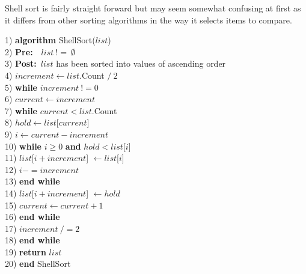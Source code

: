 Shell sort is fairly straight forward but may seem somewhat confusing at first as it differs from other sorting algorithms in the way it selects items to compare. 

\begin{tabbing}
1)  \textbf{alg}\= \textbf{orithm} ShellSort($list$) \\
2)  \> \textbf{Pre:}~~$list~!=~\emptyset$ \\
3)  \> \textbf{Post:}~$list$ has been sorted into values of ascending order \\
4)  \> $increment \leftarrow list$.Count $/~2$ \\
5)  \> \textbf{whi}\= \textbf{le} $increment~!= 0$ \\
6)  \> \> $current \leftarrow increment$ \\
7)  \> \> \textbf{whi}\= \textbf{le} $current < list$.Count \\
8)  \> \> \> $hold \leftarrow list$[$current$] \\
9)  \> \> \> $i \leftarrow current - increment$ \\
10) \> \> \> \textbf{whi}\= \textbf{le} $i \geq 0$ \textbf{and} $hold < list$[$i$] \\
11) \> \> \> \> $list$[$i + increment$] $\leftarrow list$[$i$] \\
12) \> \> \> \> $i -= increment$ \\
13) \> \> \> \textbf{end while} \\
14) \> \> \> $list$[$i + increment$] $\leftarrow hold$ \\
15) \> \> \> $current \leftarrow current + 1$ \\
16) \> \> \textbf{end while} \\
17) \> \> $increment~/= 2$ \\
18) \> \textbf{end while} \\
19) \> \textbf{return} $list$ \\
20) \textbf{end} ShellSort \\
\end{tabbing}

